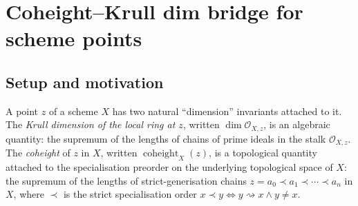 
\chapter{Coheight--Krull dim bridge for scheme points}
\label{chap:Albanese_CoheightBridge}


\section{Setup and motivation}
\label{sec:coheight_setup}

A point \(z\) of a scheme \(X\) has two natural ``dimension'' invariants attached
to it. The \emph{Krull dimension of the local ring at \(z\)}, written
\(\dim \mathcal{O}_{X,z}\), is an algebraic quantity: the supremum of the lengths
of chains of prime ideals in the stalk \(\mathcal{O}_{X,z}\). The
\emph{coheight} of \(z\) in \(X\), written \(\operatorname{coheight}_X(z)\), is a
topological quantity attached to the specialisation preorder on the underlying
topological space of \(X\): the supremum of the lengths of strict-generisation
chains \(z = a_0 \prec a_1 \prec \cdots \prec a_n\) in \(X\), where \(\prec\) is the
strict specialisation order \(x \prec y \iff y \rightsquigarrow x \wedge y \neq x\).

